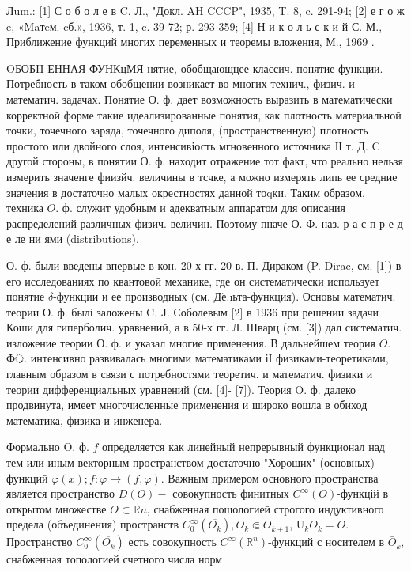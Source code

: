 \documentclass[10pt]{article}
\begin{document}
Лum.: [1] С о б о л е в C. Л., "Докл. AH CCCP", 1935, T. 8, c. 291-94; [2] е г о ж e, «Maтeм. cб.», 1936, т. 1, c. 39-72; р. 293-359; [4] Н и к о л ь с к и й С. М., Приближение функций многих переменных и теоремы вложения, М., 1969 .



OБОБII ЕННАЯ ФУНКцМЯ нятие, обобщающцее классич. понятие функции. Потребность в таком обобщении возникает во многих технич., физич. и математич. задачах. Понятие О. ф. дает возможность выразить в математически корректной форме такие идеализированные понятия, как плотность материальной точки, точечного заряда, точечного диполя, (пространственную) плотность простого или двойного слоя, интенсивіость мгновенного источника ІІ т. Д. C другой стороны, в понятии О. ф. находит отражение тот факт, что реально нельзя измерить значенге фиизйч. величины в тсчке, а можно измерять липь ее средние значения в достаточно малых окрестностях данной тоqки. Таким образом, техника $O$. ф. служит удобным и адекватным аппаратом для описания распределений различных физич. величин. Поэтому пначе О. Ф. наз. р а с п р е д е ле ни ями (distributions).



О. ф. были введены впервые в кон. 20-х гг. 20 в. П. Дираком (P. Dirac, см. [1]) в его исследованиях по квантовой механике, где он систематически использует понятие $\delta$-функции и ее производных (см. Д̆е.ıьта-функция). Основы математич. теории О. ф. былі заложены C. J. Соболевым [2] в 1936 при решении задачи Коши для гиперболич. уравнений, а в 50-х гг. Л. Шварц (см. [3]) дал систематич. изложение теории О. ф. и указал многие применения. В дальнейшем теория $O$. Ф्र. интенсивно развивалась многими математиками іІ физиками-теоретиками, главным образом в связи с потребностями теоретич. и математич. физики и теории дифференциальных уравнений (см. [4]- [7]). Теория O. ф. далеко продвинута, имеет многочисленные применения и широко вошла в обиход математика, физика и инженера.



Формально O. ф. $f$ определяется как линейный непрерывный функционал над тем или иным векторным пространством достаточно "Хороших" (основных) функций $\varphi(x) ; f: \varphi \rightarrow(f, \varphi)$. Важным примером основного пространства является пространство $D(O)-$ совокупность финитных $C^{\infty}(O)$-функцій в открытом множестве $O \subset \mathbb{R} n$, снабженная пошологией строгого индуктивного предела (объединения) пространств $C_{0}^{\infty}\left(\overline{O_{k}}\right), O_{k} \Subset O_{k+1}$, $\mathrm{U}_{k} O_{k}=O$. Пространство $C_{0}^{\infty}\left(\overline{O_{k}}\right)$ есть совокупность $C^{\infty}\left(\mathbb{R}^{n}\right)$-функций с носителем в $\bar{O}_{k}$, снабженная топологией счетного числа норм
\end{document}
